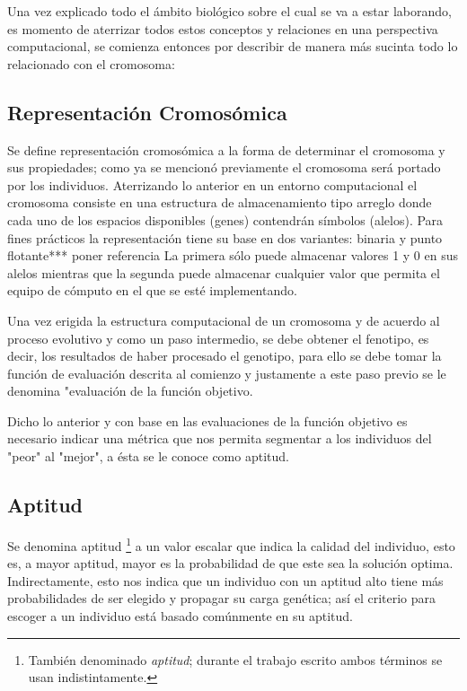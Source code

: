 \documentclass[class=report, crop=false]{standalone}
\begin{document}
Una vez explicado todo el ámbito biológico sobre el cual se va a 
estar laborando, es momento de aterrizar todos estos conceptos 
y relaciones en una perspectiva computacional, se comienza entonces 
por describir de manera más sucinta todo lo relacionado con el 
cromosoma:

\subsection{Representación Cromosómica}
\label{sec:c2_5}
Se define representación cromosómica a la forma de determinar 
el cromosoma y sus propiedades; como ya se mencionó previamente 
el cromosoma será portado por los individuos.\break
Aterrizando lo anterior en un entorno computacional el cromosoma 
consiste en una estructura de almacenamiento tipo arreglo donde cada 
uno de los espacios disponibles (genes) contendrán símbolos (alelos).
Para fines prácticos la representación tiene su base en dos variantes: 
binaria y punto flotante*** poner referencia
La primera sólo puede almacenar valores 1 y 0 en sus alelos mientras 
que la segunda puede almacenar cualquier valor que permita el equipo 
de cómputo en el que se esté implementando.

Una vez erigida la estructura computacional de un cromosoma y de
acuerdo al proceso evolutivo y como un paso intermedio, se debe
obtener el fenotipo, es decir, los resultados de haber procesado el 
genotipo, para ello se debe tomar la función de evaluación descrita al
comienzo y justamente a este paso previo se le denomina "evaluación de la
función objetivo.\break

Dicho lo anterior y con base en las evaluaciones de la función objetivo 
es necesario indicar una métrica que nos permita segmentar a los individuos 
del "peor" al "mejor", a ésta se le conoce como aptitud.

\subsection{Aptitud}
\label{sec:c2_3}
Se denomina aptitud \footnote{También denominado \textit{aptitud}; 
durante el trabajo escrito ambos términos se usan indistintamente.} 
a un valor escalar que indica la calidad del individuo, esto es, 
a mayor aptitud, mayor es la probabilidad de que este sea la 
solución optima.\break
Indirectamente, esto nos indica que un individuo con un 
aptitud alto tiene más probabilidades de ser elegido y propagar 
su carga genética; así el criterio para escoger a un individuo 
está basado comúnmente en su aptitud.\medskip\break
\end{document}
